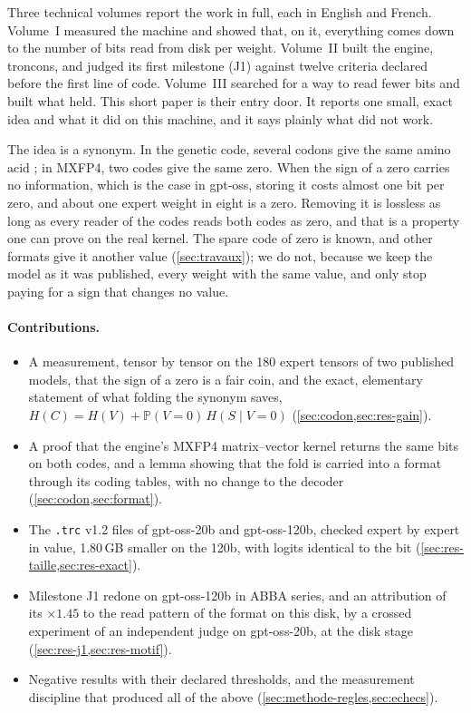 \documentclass[11pt, a4paper]{article}
\theoremstyle{remark}
\newcommand{\Prob}{\mathbb{P}}
\begin{document}
Three technical volumes report the work in full, each in English and French. Volume~I \citep{troncons-tome1} measured the machine and showed that, on it, everything comes down to the number of bits read from disk per weight. Volume~II \citep{troncons-tome2} built the engine, troncons, and judged its first milestone (J1) against twelve criteria declared before the first line of code. Volume~III \citep{troncons-tome3} searched for a way to read fewer bits and built what held. This short paper is their entry door. It reports one small, exact idea and what it did on this machine, and it says plainly what did not work.

The idea is a synonym. In the genetic code, several codons give the same amino acid \citep{crick1968}; in MXFP4, two codes give the same zero. When the sign of a zero carries no information, which is the case in gpt-oss, storing it costs almost one bit per zero, and about one expert weight in eight is a zero. Removing it is lossless as long as every reader of the codes reads both codes as zero, and that is a property one can prove on the real kernel. The spare code of zero is known, and other formats give it another value (\cref{sec:travaux}); we do not, because we keep the model as it was published, every weight with the same value, and only stop paying for a sign that changes no value.

\paragraph{Contributions.}
\begin{itemize}
\item A measurement, tensor by tensor on the 180 expert tensors of two published models, that the sign of a zero is a fair coin, and the exact, elementary statement of what folding the synonym saves, $H(C) = H(V) + \Prob(V = 0)\,H(S \mid V = 0)$ (\cref{sec:codon,sec:res-gain}).
\item A proof that the engine's MXFP4 matrix--vector kernel returns the same bits on both codes, and a lemma showing that the fold is carried into a format through its coding tables, with no change to the decoder (\cref{sec:codon,sec:format}).
\item The \texttt{.trc} v1.2 files of gpt-oss-20b and gpt-oss-120b, checked expert by expert in value, 1.80\,GB smaller on the 120b, with logits identical to the bit (\cref{sec:res-taille,sec:res-exact}).
\item Milestone J1 redone on gpt-oss-120b in ABBA series, and an attribution of its $\times 1.45$ to the read pattern of the format on this disk, by a crossed experiment of an independent judge on gpt-oss-20b, at the disk stage (\cref{sec:res-j1,sec:res-motif}).
\item Negative results with their declared thresholds, and the measurement discipline that produced all of the above (\cref{sec:methode-regles,sec:echecs}).
\end{itemize}
\end{document}
